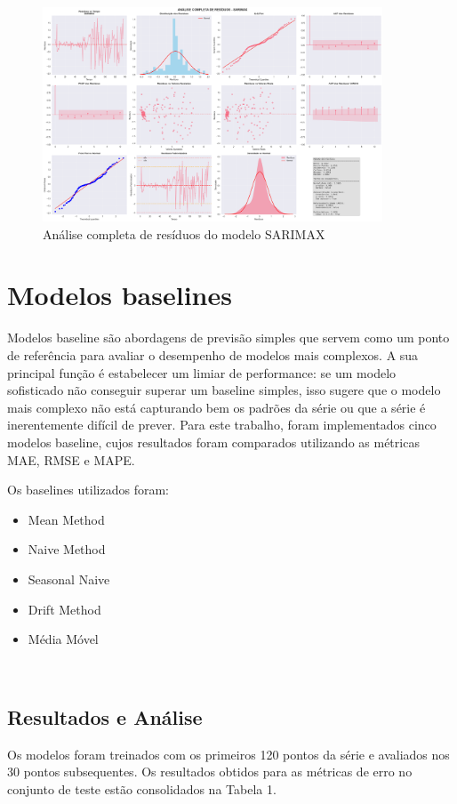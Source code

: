 \documentclass{article}
\begin{document}
\begin{figure}[H]
    \centering
    \includegraphics[width=0.9\textwidth]{images/sarimax_analisado.png}
    \caption{Análise completa de resíduos do modelo SARIMAX}
    \label{fig:sarimax_residuals}
\end{figure}



\section*{Modelos baselines}

Modelos baseline são abordagens de previsão simples que servem como um ponto de referência para avaliar o desempenho de modelos mais complexos. A sua principal função é estabelecer um limiar de performance: se um modelo sofisticado não conseguir superar um baseline simples, isso sugere que o modelo mais complexo não está capturando bem os padrões da série ou que a série é inerentemente difícil de prever. Para este trabalho, foram implementados cinco modelos baseline, cujos resultados foram comparados utilizando as métricas MAE, RMSE e MAPE.

Os baselines utilizados foram:
\begin{itemize}
    \item Mean Method
    \item Naive Method
    \item Seasonal Naive
    \item Drift Method
    \item Média Móvel
\end{itemize}
\\

\subsection*{Resultados e Análise}
Os modelos foram treinados com os primeiros 120 pontos da série e avaliados nos 30 pontos subsequentes. Os resultados obtidos para as métricas de erro no conjunto de teste estão consolidados na Tabela 1.\\
\end{document}
